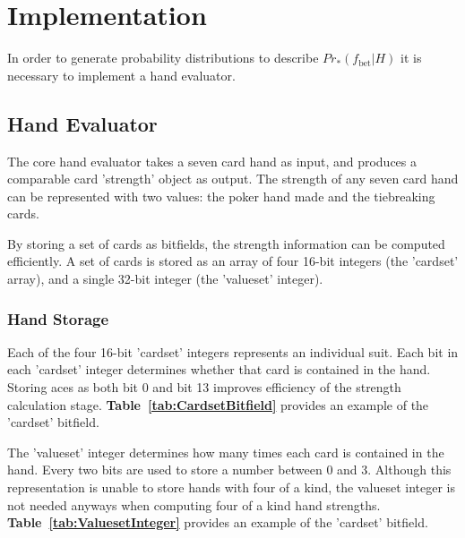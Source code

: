 
\clearpage


\chapter{Implementation}
\label{sec:Implementation}

In order to generate probability distributions to describe $Pr_\mathrm{*} \left( f_\mathrm{bet} | H \right)$ it is necessary to implement a hand evaluator.

\section{Hand Evaluator}
\label{sec:HandEvaluator}

The core hand evaluator takes a seven card hand as input, and produces a comparable card 'strength' object as output.
The strength of any seven card hand can be represented with two values: the poker hand made and the tiebreaking cards.

By storing a set of cards as bitfields, the strength information can be computed efficiently.
A set of cards is stored as an array of four 16-bit integers (the 'cardset' array), and a single 32-bit integer (the 'valueset' integer).

\subsection{Hand Storage}
\label{sec:HandStorage}

Each of the four 16-bit 'cardset' integers represents an individual suit.
Each bit in each 'cardset' integer determines whether that card is contained in the hand.
Storing aces as both bit 0 and bit 13 improves efficiency of the strength calculation stage.
\textbf{Table~\ref{tab:CardsetBitfield}} provides an example of the 'cardset' bitfield.

The 'valueset' integer determines how many times each card is contained in the hand.
Every two bits are used to store a number between 0 and 3.
Although this representation is unable to store hands with four of a kind, the valueset integer is not needed anyways when computing four of a kind hand strengths.
\textbf{Table~\ref{tab:ValuesetInteger}} provides an example of the 'cardset' bitfield.

